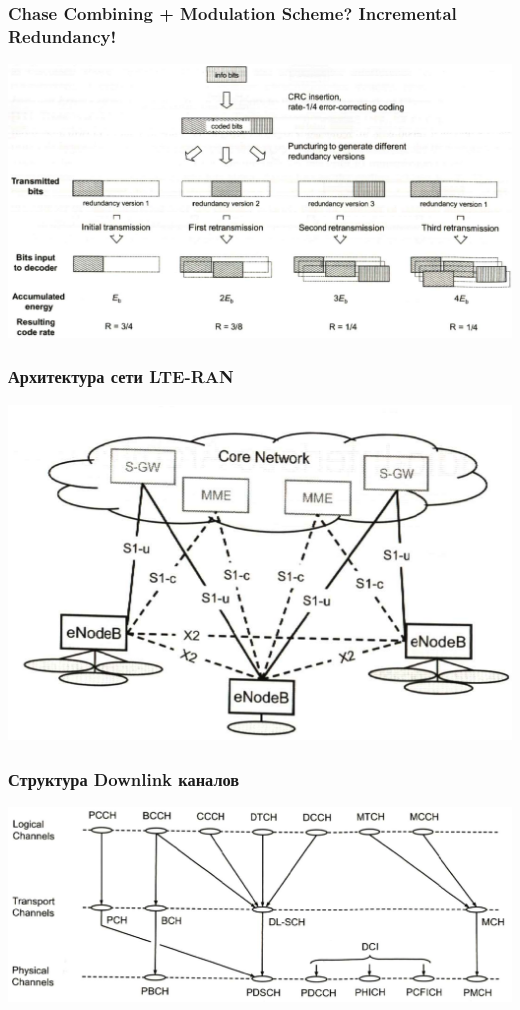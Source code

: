 \documentclass[utf8]{beamer}
\begin{document}
\begin{frame}
\frametitle{Chase Combining + Modulation Scheme? Incremental Redundancy!}
\begin{center}
\includegraphics[width=\textwidth]{pic/incremental-redundancy.png}
\end{center}
\end{frame}
\begin{frame}
\frametitle{Архитектура сети LTE-RAN}
\begin{center}
\includegraphics[width=\textwidth]{pic/ran-ifaces.png}
\end{center}
\end{frame}
\begin{frame}
\frametitle{Структура Downlink каналов}
\begin{center}
\includegraphics[width=\textwidth]{pic/DL-channels.png}
\end{center}
\end{frame}
\end{document}
